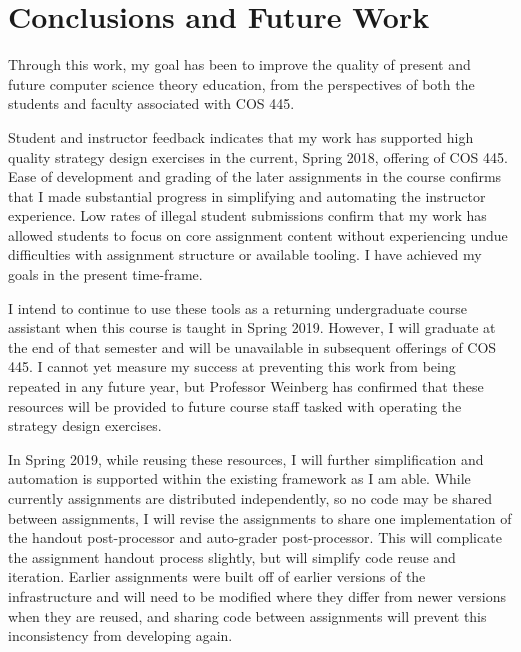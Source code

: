 \documentclass[pageno]{jpaper}
\begin{document}


\section*{Conclusions and Future Work}
Through this work, my goal has been to improve the quality of present and future computer science theory education, from the perspectives of both the students and faculty associated with COS 445.

Student and instructor feedback indicates that my work has supported high quality strategy design exercises in the current, Spring 2018, offering of COS 445.
Ease of development and grading of the later assignments in the course confirms that I made substantial progress in simplifying and automating the instructor experience.
Low rates of illegal student submissions confirm that my work has allowed students to focus on core assignment content without experiencing undue difficulties with assignment structure or available tooling.
I have achieved my goals in the present time-frame.

I intend to continue to use these tools as a returning undergraduate course assistant when this course is taught in Spring 2019.
However, I will graduate at the end of that semester and will be unavailable in subsequent offerings of COS 445.
I cannot yet measure my success at preventing this work from being repeated in any future year, but Professor Weinberg has confirmed that these resources will be provided to future course staff tasked with operating the strategy design exercises.

In Spring 2019, while reusing these resources, I will further simplification and automation is supported within the existing framework as I am able.
While currently assignments are distributed independently, so no code may be shared between assignments, I will revise the assignments to share one implementation of the handout post-processor and auto-grader post-processor.
This will complicate the assignment handout process slightly, but will simplify code reuse and iteration.
Earlier assignments were built off of earlier versions of the infrastructure and will need to be modified where they differ from newer versions when they are reused, and sharing code between assignments will prevent this inconsistency from developing again.
\end{document}
